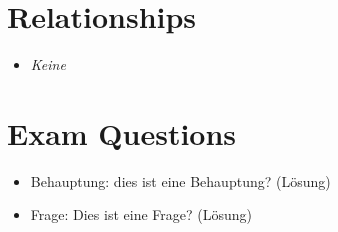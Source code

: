 \section{Relationships}
\begin{itemize}
	\item \textit{Keine} 
\end{itemize}

\section{Exam Questions}
\begin{itemize}
  \item Behauptung: dies ist eine Behauptung? (Lösung)
    \item Frage: Dies ist eine Frage? (Lösung)
\end{itemize}
